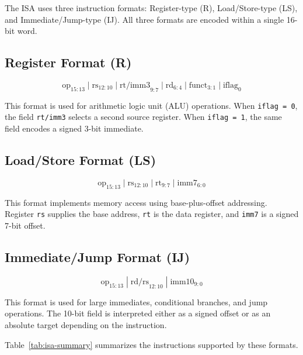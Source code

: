 \documentclass[12pt]{report}
\begin{document}
The ISA uses three instruction formats: Register-type (R), Load/Store-type
(LS), and Immediate/Jump-type (IJ). All three formats are encoded within a
single 16-bit word.

\subsection{Register Format (R)}
\[
\text{op}_{15:13} \;|\; \text{rs}_{12:10} \;|\; \text{rt/imm3}_{9:7} \;|\;
\text{rd}_{6:4} \;|\; \text{funct}_{3:1} \;|\; \text{iflag}_{0}
\]

This format is used for arithmetic logic unit (ALU) operations. When
\texttt{iflag = 0}, the field
\texttt{rt/imm3} selects a second source register. When \texttt{iflag = 1}, the
same field encodes a signed 3-bit immediate.

\subsection{Load/Store Format (LS)}
\[
\text{op}_{15:13} \;|\; \text{rs}_{12:10} \;|\; \text{rt}_{9:7} \;|\;
\text{imm7}_{6:0}
\]

This format implements memory access using base-plus-offset addressing.
Register \texttt{rs} supplies the base address, \texttt{rt} is the data
register, and \texttt{imm7} is a signed 7-bit offset.

\subsection{Immediate/Jump Format (IJ)}
\[
\text{op}_{15:13} \;|\; \text{rd/rs}_{12:10} \;|\; \text{imm10}_{9:0}
\]

This format is used for large immediates, conditional branches, and jump
operations. The 10-bit field is interpreted either as a signed offset or as an
absolute target depending on the instruction.

Table~\ref{tab:isa-summary} summarizes the instructions supported by these
formats.
\end{document}
